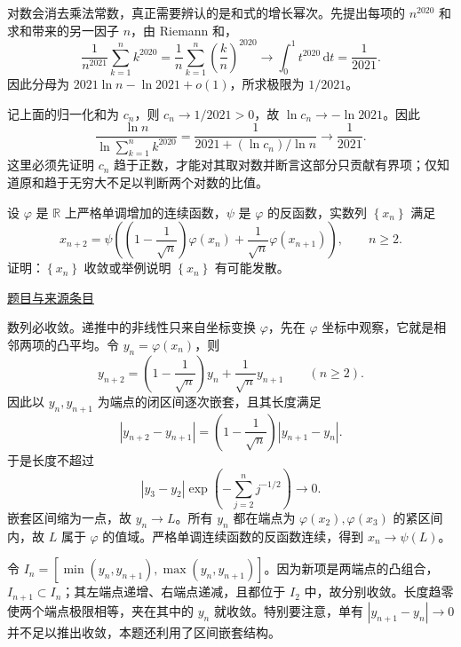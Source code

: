 \documentclass[UTF8,12pt,a4paper,fontset=fandol]{ctexart}
\begin{document}
\begin{solve}\label{ans:ch09-12th-A:2}

对数会消去乘法常数，真正需要辨认的是和式的增长幂次。先提出每项的 $n^{2020}$ 和求和带来的另一因子 $n$，由 Riemann 和，
\[
\frac1{n^{2021}}\sum_{k=1}^n k^{2020}
=\frac1n\sum_{k=1}^n\left(\frac kn\right)^{2020}
\longrightarrow\int_0^1t^{2020}\,\mathrm dt=\frac1{2021}.
\]
因此分母为 $2021\ln n-\ln2021+o(1)$，所求极限为 $1/2021$。

记上面的归一化和为 $c_n$，则 $c_n\to1/2021>0$，故 $\ln c_n\to-\ln2021$。因此
\[
\frac{\ln n}{\ln\sum_{k=1}^nk^{2020}}
=\frac1{2021+(\ln c_n)/\ln n}\longrightarrow\frac1{2021}.
\]
这里必须先证明 $c_n$ 趋于正数，才能对其取对数并断言这部分只贡献有界项；仅知道原和趋于无穷大不足以判断两个对数的比值。

\end{solve}

\begin{example}[来源序号5]\label{ex:ch09-12th-A:5}\label{pr:ch09-12th-A:5}

设 $\varphi$ 是 $\mathbb{R}$ 上严格单调增加的连续函数，$\psi$ 是 $\varphi$ 的反函数，实数列 $\left\{x_{n}\right\}$ 满足
\[
x_{n+2}=\psi\left(\left(1-\frac{1}{\sqrt{n}}\right)\varphi\left(x_{n}\right)+\frac{1}{\sqrt{n}}\varphi\left(x_{n+1}\right)\right),\qquad n\geq 2.
\]
证明：$\left\{x_{n}\right\}$ 收敛或举例说明 $\left\{x_{n}\right\}$ 有可能发散。

\par\href{https://github.com/lzxcr/cmc-mathematics/blob/64916fa1fdbc3e444a652eca204d5669058ee321/src/problems/preliminary/12/05.md}{题目与来源条目}

\end{example}

\begin{solve}\label{ans:ch09-12th-A:5}

数列必收敛。递推中的非线性只来自坐标变换 $\varphi$，先在 $\varphi$ 坐标中观察，它就是相邻两项的凸平均。令 $y_n=\varphi(x_n)$，则
\[
y_{n+2}=\left(1-\frac1{\sqrt n}\right)y_n
+\frac1{\sqrt n}y_{n+1}\qquad(n\geq2).
\]
因此以 $y_n,y_{n+1}$ 为端点的闭区间逐次嵌套，且其长度满足
\[
|y_{n+2}-y_{n+1}|
=\left(1-\frac1{\sqrt n}\right)|y_{n+1}-y_n|.
\]
于是长度不超过
\[
|y_3-y_2|\exp\left(-\sum_{j=2}^n j^{-1/2}\right)\longrightarrow0.
\]
嵌套区间缩为一点，故 $y_n\to L$。所有 $y_n$ 都在端点为 $\varphi(x_2),\varphi(x_3)$ 的紧区间内，故 $L$ 属于 $\varphi$ 的值域。严格单调连续函数的反函数连续，得到 $x_n\to\psi(L)$。

令 $I_n=[\min(y_n,y_{n+1}),\max(y_n,y_{n+1})]$。因为新项是两端点的凸组合，$I_{n+1}\subset I_n$；其左端点递增、右端点递减，且都位于 $I_2$ 中，故分别收敛。长度趋零使两个端点极限相等，夹在其中的 $y_n$ 就收敛。特别要注意，单有 $|y_{n+1}-y_n|\to0$ 并不足以推出收敛，本题还利用了区间嵌套结构。

\end{solve}
\end{document}
